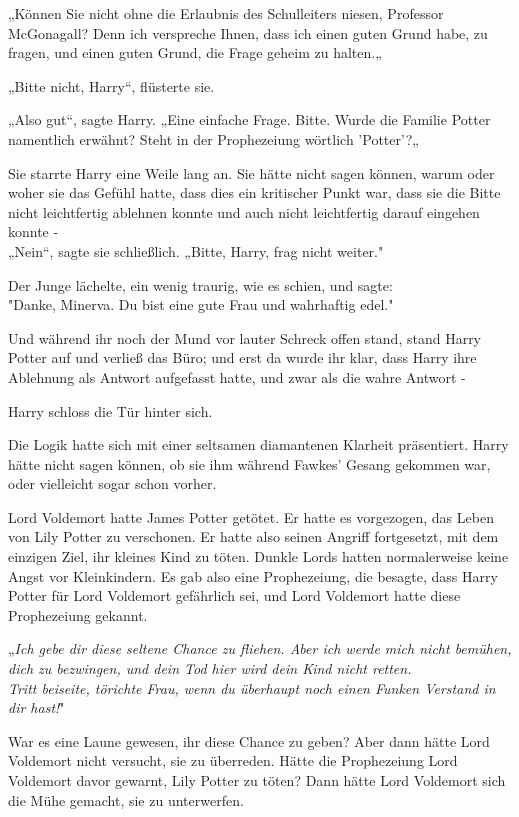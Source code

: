{„Können Sie nicht ohne die Erlaubnis des Schulleiters niesen, Professor McGonagall? Denn ich verspreche Ihnen, dass ich einen guten Grund habe, zu fragen, und einen guten Grund, die Frage geheim zu halten.„

„Bitte nicht, Harry“, flüsterte sie.

„Also gut“, sagte Harry. „Eine einfache Frage. Bitte. Wurde die Familie Potter namentlich erwähnt? Steht in der Prophezeiung wörtlich 'Potter'?„

Sie starrte Harry eine Weile lang an. Sie hätte nicht sagen können, warum oder woher sie das Gefühl hatte, dass dies ein kritischer Punkt war, dass sie die Bitte nicht leichtfertig ablehnen konnte und auch nicht leichtfertig darauf eingehen konnte -\\ „Nein“, sagte sie schließlich. „Bitte, Harry, frag nicht weiter."

Der Junge lächelte, ein wenig traurig, wie es schien, und sagte:\\ "Danke, Minerva. Du bist eine gute Frau und wahrhaftig edel."

Und während ihr noch der Mund vor lauter Schreck offen stand, stand Harry Potter auf und verließ das Büro; und erst da wurde ihr klar, dass Harry ihre Ablehnung als Antwort aufgefasst hatte, und zwar als die wahre Antwort -

Harry schloss die Tür hinter sich.

Die Logik hatte sich mit einer seltsamen diamantenen Klarheit präsentiert. Harry hätte nicht sagen können, ob sie ihm während Fawkes' Gesang gekommen war, oder vielleicht sogar schon vorher.

Lord Voldemort hatte James Potter getötet. Er hatte es vorgezogen, das Leben von Lily Potter zu verschonen. Er hatte also seinen Angriff fortgesetzt, mit dem einzigen Ziel, ihr kleines Kind zu töten. Dunkle Lords hatten normalerweise keine Angst vor Kleinkindern. Es gab also eine Prophezeiung, die besagte, dass Harry Potter für Lord Voldemort gefährlich sei, und Lord Voldemort hatte diese Prophezeiung gekannt.

„\emph{Ich gebe dir diese seltene Chance zu fliehen. Aber ich werde mich nicht bemühen, dich zu bezwingen, und dein Tod hier wird dein Kind nicht retten.\\ Tritt beiseite, törichte Frau, wenn du überhaupt noch einen Funken Verstand in dir hast!}"

War es eine Laune gewesen, ihr diese Chance zu geben? Aber dann hätte Lord Voldemort nicht versucht, sie zu überreden. Hätte die Prophezeiung Lord Voldemort davor gewarnt, Lily Potter zu töten? Dann hätte Lord Voldemort sich die Mühe gemacht, sie zu unterwerfen.

}
